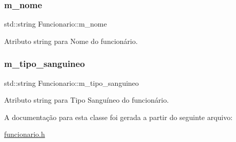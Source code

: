 \subsubsection{\texorpdfstring{m\+\_\+nome}{m\_nome}}
{\footnotesize\ttfamily std\+::string Funcionario\+::m\+\_\+nome\hspace{0.3cm}{\ttfamily [protected]}}

Atributo string para Nome do funcionário. \mbox{\label{classFuncionario_aa09cfc8a989b1a292cd21380a5fcb8bc}} 
\subsubsection{\texorpdfstring{m\+\_\+tipo\+\_\+sanguineo}{m\_tipo\_sanguineo}}
{\footnotesize\ttfamily std\+::string Funcionario\+::m\+\_\+tipo\+\_\+sanguineo\hspace{0.3cm}{\ttfamily [protected]}}

Atributo string para Tipo Sanguíneo do funcionário. 

A documentação para esta classe foi gerada a partir do seguinte arquivo\+:\begin{DoxyCompactItemize}
\item 
\hyperlink{funcionario_8h}{funcionario.\+h}\end{DoxyCompactItemize}
